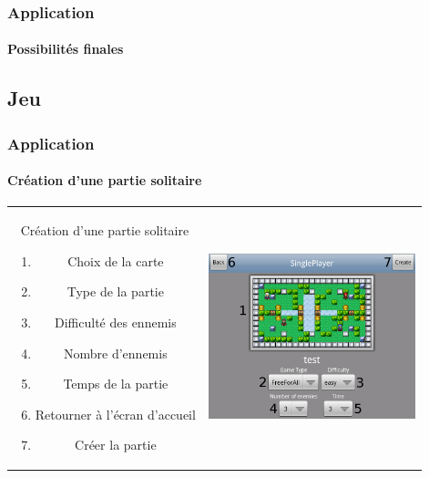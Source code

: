 	\begin{frame}
	\frametitle{Application}
	\framesubtitle{Possibilités finales}
	
	\end{frame}

\subsection{Jeu}
	
	\begin{frame}
	\frametitle{Application}
	\framesubtitle{Création d'une partie solitaire}
	
		\begin{tabular}{cc}
			\begin{minipage}{5cm}
				Création d'une partie solitaire
				\begin{enumerate}
					\item Choix de la carte
					\item Type de la partie
					\item Difficulté des ennemis
					\item Nombre d'ennemis
					\item Temps de la partie
					\item Retourner à l'écran d'accueil
					\item Créer la partie
				\end{enumerate}
			\end{minipage} &
			\begin{minipage}{7cm}
				\includegraphics[width=6cm]{img/singleplayerbis.png} 
			\end{minipage}\\
		\end{tabular}
	
	\end{frame}
	

